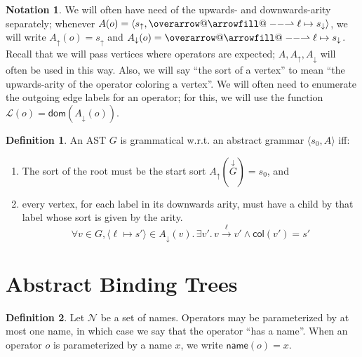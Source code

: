 \documentclass[11pt]{article} %
\makeatletter
\theoremstyle{definition}
\newtheorem{dfn}{Definition}
\newtheorem*{ntn}{Notation}
\newcommand{\Ell}{\mathscr{L}}
\def\rightharpoonupfill@{\arrowfill@\relbar\relbar\rightharpoonup}
\newcommand{\harpvec}{%
   \mathpalette{\overarrow@\rightharpoonupfill@}}
\makeatother
\begin{document}
\begin{ntn}
We will often have need of the upwards- and downwards-arity separately; whenever $A(o) = \langle s_\uparrow, \harpvec{\ell \mapsto s_\downarrow} \rangle$, we will write $A_\uparrow(o) = s_\uparrow$ and $A_\downarrow(o) = \harpvec{\ell \mapsto s_\downarrow}$.
Recall that we will pass vertices where operators are expected; $A, A_\uparrow, A_\downarrow$ will often be used in this way.
Also, we will say ``the sort of a vertex'' to mean ``the upwards-arity of the operator coloring a vertex''.
We will often need to enumerate the outgoing edge labels for an operator; for this, we will use the function $\Ell(o) = \mathsf{dom}(A_\downarrow(o))$.
\end{ntn}

\begin{dfn}
An AST $G$ is grammatical w.r.t. an abstract grammar $\langle s_0, A \rangle$ iff:
\begin{enumerate}[label=\alph*)]
\item The sort of the root must be the start sort $A_\uparrow(\overset{\downarrow}G) = s_0$, and
\item every vertex, for each label in its downwards arity, must have a child by that label whose sort is given by the arity.
    $$\forall v \in G, \langle \ell \mapsto s' \rangle \in A_\downarrow(v).\, \exists v'.\,v \overset{\ell}\to v' \land \mathsf{col}(v') = s'$$
\end{enumerate}
\end{dfn}


\section{Abstract Binding Trees}

\begin{dfn}
Let $\mathcal{N}$ be a set of names.
Operators may be parameterized by at most one name, in which case we say that the operator ``has a name''.
When an operator $o$ is parameterized by a name $x$, we write $\mathsf{name}(o) = x$.
\end{dfn}
\end{document}
